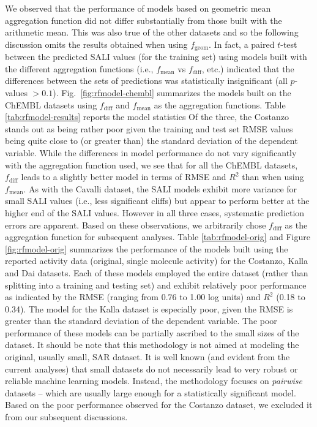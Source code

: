 \documentclass[letterpaper, 12pt]{article}
\begin{document}
We observed that the performance of models based on geometric mean aggregation function did not
differ substantially from those built with the arithmetic mean. This was also true of the other
datasets and so the following discussion omits the results obtained when using
$f_{\textrm{geom}}$. In fact, a paired $t$-test between the predicted SALI values (for the training
set) using models built with the different aggregation functions (i.e., $f_{\textrm{mean}}$ vs
$f_{\textrm{diff}}$, etc.)  indicated that the differences between the sets of predictions was
statistically insignificant (all $p$-values $> 0.1$). Fig.~\ref{fig:rfmodel-chembl} summarizes the
models built on the ChEMBL datasets using $f_{\textrm{diff}}$ and $f_{\textrm{mean}}$ as the
aggregation functions. Table \ref{tab:rfmodel-results} reports the model statistics Of the three,
the Costanzo stands out as being rather poor given the training and test set RMSE values being quite
close to (or greater than) the standard deviation of the dependent variable.  While the differences
in model performance do not vary significantly with the aggregation function used, we see that for
all the ChEMBL datasets, $f_{\textrm{diff}}$ leads to a slightly better model in terms of RMSE and
$R^2$ than when using $f_{\textrm{mean}}$. As with the Cavalli dataset, the SALI models exhibit more
variance for small SALI values (i.e., less significant cliffs) but appear to perform better at the
higher end of the SALI values. However in all three cases, systematic prediction errors are
apparent. Based on these observations, we arbitrarily chose $f_{\textrm{diff}}$ as the aggregation
function for subsequent analyses. Table \ref{tab:rfmodel-orig} and Figure \ref{fig:rfmodel-orig}
summarizes the performance of the models built using the reported activity data (original, single
molecule activity) for the Costanzo, Kalla and Dai datasets. Each of these models employed the
entire dataset (rather than splitting into a training and testing set) and exhibit relatively poor
performance as indicated by the RMSE (ranging from 0.76 to 1.00 log units) and $R^2$ (0.18 to
0.34). The model for the Kalla dataset is especially poor, given the RMSE is greater than the
standard deviation of the dependent variable. The poor performance of these models can be partially
ascribed to the small sizes of the dataset. It should be note that this methodology is not aimed at
modeling the original, usually small, SAR dataset. It is well known (and evident from the current
analyses) that small datasets do not necessarily lead to very robust or reliable machine learning
models. Instead, the methodology focuses on \emph{pairwise} datasets -- which are usually large
enough for a statistically significant model. Based on the poor performance observed for the
Costanzo dataset, we excluded it from our subsequent discussions.
\end{document}

